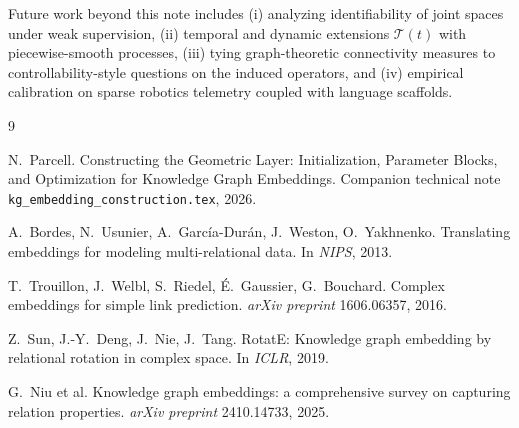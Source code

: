 \documentclass[11pt]{article}
\begin{document}
Future work beyond this note includes (i) analyzing identifiability of joint spaces under weak supervision, (ii) temporal and dynamic extensions $\mathcal{T}(t)$ with piecewise-smooth processes, (iii) tying graph-theoretic connectivity measures to controllability-style questions on the induced operators, and (iv) empirical calibration on sparse robotics telemetry coupled with language scaffolds.

\begin{thebibliography}{9}

N.~Parcell.
\newblock Constructing the Geometric Layer: Initialization, Parameter Blocks, and Optimization for Knowledge Graph Embeddings.
\newblock Companion technical note \texttt{kg\_embedding\_construction.tex}, 2026.

A.~Bordes, N.~Usunier, A.~Garc\'ia-Dur\'an, J.~Weston, O.~Yakhnenko.
\newblock Translating embeddings for modeling multi-relational data.
\newblock In \emph{NIPS}, 2013.

T.~Trouillon, J.~Welbl, S.~Riedel, \'E.~Gaussier, G.~Bouchard.
\newblock Complex embeddings for simple link prediction.
\newblock \emph{arXiv preprint} 1606.06357, 2016.

Z.~Sun, J.-Y.~Deng, J.~Nie, J.~Tang.
\newblock RotatE: Knowledge graph embedding by relational rotation in complex space.
\newblock In \emph{ICLR}, 2019.

G.~Niu et al.
\newblock Knowledge graph embeddings: a comprehensive survey on capturing relation properties.
\newblock \emph{arXiv preprint} 2410.14733, 2025.

\end{thebibliography}
\end{document}
